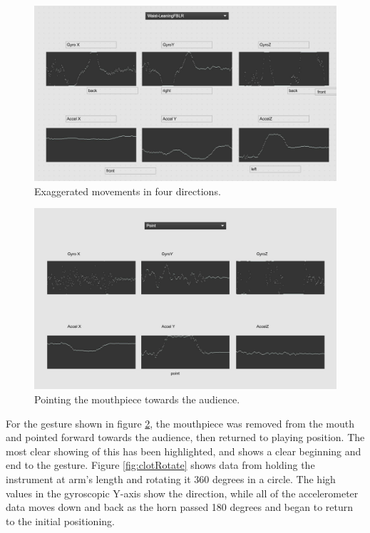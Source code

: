  \begin{figure}
    \centering
    \includegraphics[scale=0.2]{diagrams/gestureData/waistLeaning.png}
    \caption{Exaggerated movements in four directions.}
    \label{fig:exVert}
\end{figure}

\begin{figure}
    \centering
    \includegraphics[scale=0.2]{diagrams/gestureData/pointing.png}
    \caption{Pointing the mouthpiece towards the audience.}
    \label{fig:pointData}
\end{figure}

For the gesture shown in figure \ref{fig:pointData}, the mouthpiece was removed from the mouth and pointed forward towards the audience, then returned to playing position. The most clear showing of this has been highlighted, and shows a clear beginning and end to the gesture. Figure \ref{fig:clotRotate} shows data from holding the instrument at arm's length and rotating it 360 degrees in a circle. The high values in the gyroscopic Y-axis show the direction, while all of the accelerometer data moves down and back as the horn passed 180 degrees and began to return to the initial positioning.

